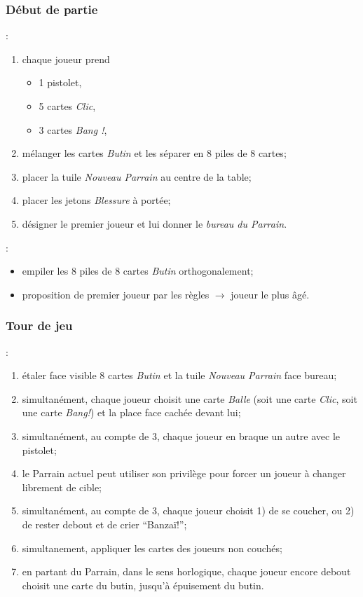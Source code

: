 \documentclass[11pt]{beamer}
\begin{document}
	\begin{frame}
		\frametitle{Début de partie}
		
		:
		\begin{enumerate}
			\item chaque joueur prend
				\begin{itemize}
					\item 1 pistolet,
					\item 5 cartes \emph{Clic},
					\item 3 cartes \emph{Bang !},
				\end{itemize}
			\item mélanger les cartes \emph{Butin} et les séparer en 8 piles de 8 cartes;
			\item placer la tuile \emph{Nouveau Parrain} au centre de la table;
			\item placer les jetons \emph{Blessure} à portée;
			\item désigner le premier joueur et lui donner le \emph{bureau du Parrain}.
		\end{enumerate}
	
		\vspace*{1ex}
	
		:
		\begin{itemize}
			\item empiler les 8 piles de 8 cartes \emph{Butin} orthogonalement;
			\item proposition de premier joueur par les règles $\rightarrow$ joueur le plus âgé.
		\end{itemize}
	\end{frame}

	\begin{frame}
		\frametitle{Tour de jeu}
		
		\structure{Déroulement d'un tour}:
		\begin{enumerate}
			\item étaler face visible 8 cartes \emph{Butin} et la tuile \emph{Nouveau Parrain} face bureau;
			\item simultanément, chaque joueur choisit une carte \emph{Balle} (soit une carte \emph{Clic}, soit une carte \emph{Bang!}) et la place face cachée devant lui;
			\item simultanément, au compte de 3, chaque joueur en braque un autre avec le pistolet;
			\item le Parrain actuel peut utiliser son privilège pour forcer un joueur à changer librement de cible;
			\item simultanément, au compte de 3, chaque joueur choisit 1) de se coucher, ou 2) de rester debout et de crier \enquote{Banzaï!};
			\item simultanement, appliquer les cartes des joueurs non couchés;
			\item en partant du Parrain, dans le sens horlogique, chaque joueur encore debout choisit une carte du butin, jusqu'à épuisement du butin.
		\end{enumerate}
	\end{frame}
\end{document}
